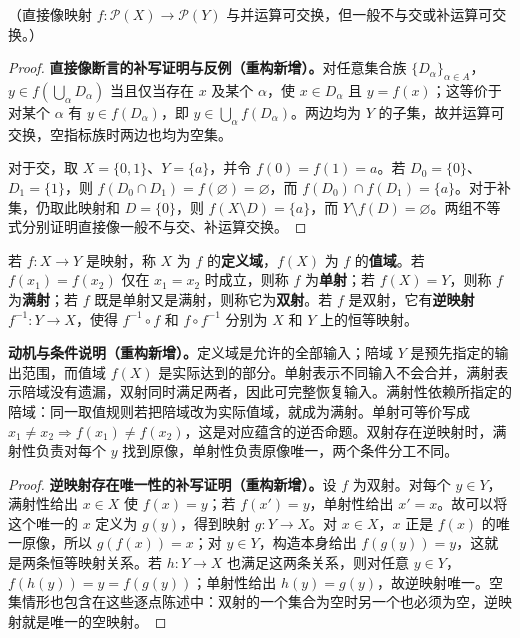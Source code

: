 \documentclass[../../main.tex]{subfiles}%
\begin{document}
\begin{remark}
（直接像映射 $f:\mathscr{P}(X)\to\mathscr{P}(Y)$ 与并运算可交换，但一般不与交或补运算可交换。）
\end{remark}
\begin{proof}
\textbf{直接像断言的补写证明与反例（重构新增）。}对任意集合族 $\{D_\alpha\}_{\alpha\in A}$，$y\in f(\bigcup_\alpha D_\alpha)$ 当且仅当存在 $x$ 及某个 $\alpha$，使 $x\in D_\alpha$ 且 $y=f(x)$；这等价于对某个 $\alpha$ 有 $y\in f(D_\alpha)$，即 $y\in\bigcup_\alpha f(D_\alpha)$。两边均为 $Y$ 的子集，故并运算可交换，空指标族时两边也均为空集。

对于交，取 $X=\{0,1\}$、$Y=\{a\}$，并令 $f(0)=f(1)=a$。若 $D_0=\{0\}$、$D_1=\{1\}$，则 $f(D_0\cap D_1)=f(\varnothing)=\varnothing$，而 $f(D_0)\cap f(D_1)=\{a\}$。对于补集，仍取此映射和 $D=\{0\}$，则 $f(X\setminus D)=\{a\}$，而 $Y\setminus f(D)=\varnothing$。两组不等式分别证明直接像一般不与交、补运算交换。
\end{proof}




\begin{definition}\label{definition:ch00-mapping-types}
若 $f:X\to Y$ 是映射，称 $X$ 为 $f$ 的\textbf{定义域}，$f(X)$ 为 $f$ 的\textbf{值域}。若 $f(x_1)=f(x_2)$ 仅在 $x_1=x_2$ 时成立，则称 $f$ 为\textbf{单射}；若 $f(X)=Y$，则称 $f$ 为\textbf{满射}；若 $f$ 既是单射又是满射，则称它为\textbf{双射}。若 $f$ 是双射，它有\textbf{逆映射} $f^{-1}:Y\to X$，使得 $f^{-1}\circ f$ 和 $f\circ f^{-1}$ 分别为 $X$ 和 $Y$ 上的恒等映射。
\end{definition}
\begin{remark}
\textbf{动机与条件说明（重构新增）。}定义域是允许的全部输入；陪域 $Y$ 是预先指定的输出范围，而值域 $f(X)$ 是实际达到的部分。单射表示不同输入不会合并，满射表示陪域没有遗漏，双射同时满足两者，因此可完整恢复输入。满射性依赖所指定的陪域：同一取值规则若把陪域改为实际值域，就成为满射。单射可等价写成 $x_1\ne x_2\Rightarrow f(x_1)\ne f(x_2)$，这是对应蕴含的逆否命题。双射存在逆映射时，满射性负责对每个 $y$ 找到原像，单射性负责原像唯一，两个条件分工不同。
\end{remark}
\begin{proof}
\textbf{逆映射存在唯一性的补写证明（重构新增）。}设 $f$ 为双射。对每个 $y\in Y$，满射性给出 $x\in X$ 使 $f(x)=y$；若 $f(x')=y$，单射性给出 $x'=x$。故可以将这个唯一的 $x$ 定义为 $g(y)$，得到映射 $g:Y\to X$。对 $x\in X$，$x$ 正是 $f(x)$ 的唯一原像，所以 $g(f(x))=x$；对 $y\in Y$，构造本身给出 $f(g(y))=y$，这就是两条恒等映射关系。若 $h:Y\to X$ 也满足这两条关系，则对任意 $y\in Y$，$f(h(y))=y=f(g(y))$；单射性给出 $h(y)=g(y)$，故逆映射唯一。空集情形也包含在这些逐点陈述中：双射的一个集合为空时另一个也必须为空，逆映射就是唯一的空映射。
\end{proof}
\end{document}
